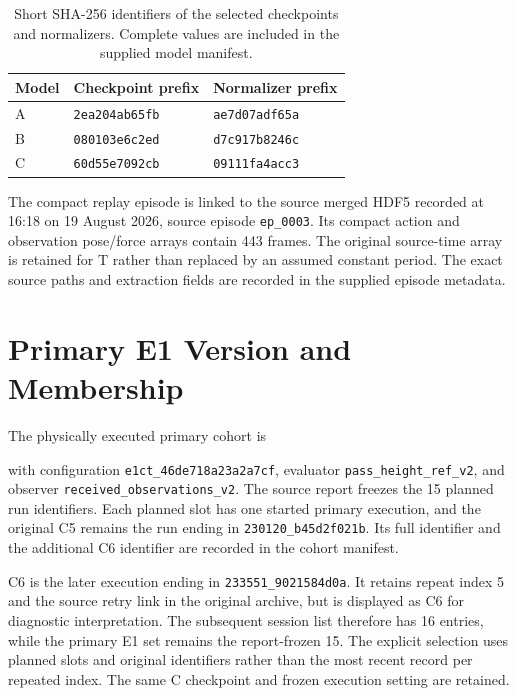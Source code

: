 \begin{table}[tbp]\centering\small
\caption[Selected model identifiers]{Short SHA-256 identifiers of the selected checkpoints and normalizers. Complete values are included in the supplied model manifest.}
\label{tab:model_provenance}
\begin{tabular}{lll}
\toprule Model & Checkpoint prefix & Normalizer prefix \\ \midrule
A & \texttt{2ea204ab65fb} & \texttt{ae7d07adf65a} \\
B & \texttt{080103e6c2ed} & \texttt{d7c917b8246c} \\
C & \texttt{60d55e7092cb} & \texttt{09111fa4acc3} \\
\bottomrule
\end{tabular}
\end{table}

The compact replay episode is linked to the source merged HDF5 recorded at 16:18 on 19 August 2026, source episode \texttt{ep\_0003}. Its compact action and observation pose/force arrays contain 443 frames. The original source-time array is retained for T rather than replaced by an assumed constant period. The exact source paths and extraction fields are recorded in the supplied episode metadata.

\section{Primary E1 Version and Membership}
The physically executed primary cohort is
\begin{quote}\small{}\end{quote}
with configuration \texttt{e1ct\_46de718a23a2a7cf}, evaluator \texttt{pass\_height\_ref\_v2}, and observer \texttt{received\_observations\_v2}. The source report freezes the 15 planned run identifiers. Each planned slot has one started primary execution, and the original C5 remains the run ending in \texttt{230120\_b45d2f021b}. Its full identifier and the additional C6 identifier are recorded in the cohort manifest.

C6 is the later execution ending in \texttt{233551\_9021584d0a}. It retains repeat index 5 and the source retry link in the original archive, but is displayed as C6 for diagnostic interpretation. The subsequent session list therefore has 16 entries, while the primary E1 set remains the report-frozen 15. The explicit selection uses planned slots and original identifiers rather than the most recent record per repeated index. The same C checkpoint and frozen execution setting are retained.

